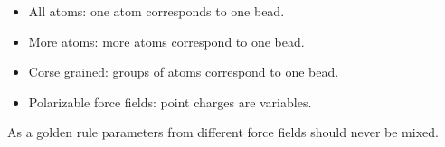 	\begin{multicols}{2}
		\begin{itemize}
			\item All atoms: one atom corresponds to one bead.
			\item More atoms: more atoms correspond to one bead.
			\item Corse grained: groups of atoms correspond to one bead.
			\item Polarizable force fields: point charges are variables.
		\end{itemize}
	\end{multicols}

	As a golden rule parameters from different force fields should never be mixed.

